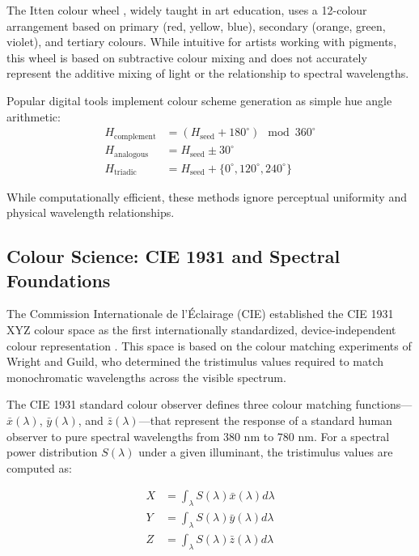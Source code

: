 \documentclass[12pt,a4paper]{article}
\newcommand{\wavelength}{\lambda}
\begin{document}
The Itten colour wheel \cite{itten1961art}, widely taught in art education, uses a 12-colour arrangement based on primary (red, yellow, blue), secondary (orange, green, violet), and tertiary colours. While intuitive for artists working with pigments, this wheel is based on subtractive colour mixing and does not accurately represent the additive mixing of light or the relationship to spectral wavelengths.

Popular digital tools implement colour scheme generation as simple hue angle arithmetic:
\begin{align}
H_{\text{complement}} &= (H_{\text{seed}} + 180^\circ) \mod 360^\circ \\
H_{\text{analogous}} &= H_{\text{seed}} \pm 30^\circ \\
H_{\text{triadic}} &= H_{\text{seed}} + \{0^\circ, 120^\circ, 240^\circ\}
\end{align}

While computationally efficient, these methods ignore perceptual uniformity and physical wavelength relationships.

\subsection{Colour Science: CIE 1931 and Spectral Foundations}

The Commission Internationale de l'Éclairage (CIE) established the CIE 1931 XYZ colour space as the first internationally standardized, device-independent colour representation \cite{cie1932commission,wyszecki2000color}. This space is based on the colour matching experiments of Wright and Guild, who determined the tristimulus values required to match monochromatic wavelengths across the visible spectrum.

The CIE 1931 standard colour observer defines three colour matching functions—$\bar{x}(\wavelength)$, $\bar{y}(\wavelength)$, and $\bar{z}(\wavelength)$—that represent the response of a standard human observer to pure spectral wavelengths from 380 nm to 780 nm. For a spectral power distribution $S(\wavelength)$ under a given illuminant, the tristimulus values are computed as:

\begin{align}
X &= \int_{\wavelength} S(\wavelength) \bar{x}(\wavelength) d\wavelength \\
Y &= \int_{\wavelength} S(\wavelength) \bar{y}(\wavelength) d\wavelength \\
Z &= \int_{\wavelength} S(\wavelength) \bar{z}(\wavelength) d\wavelength
\end{align}
\end{document}
